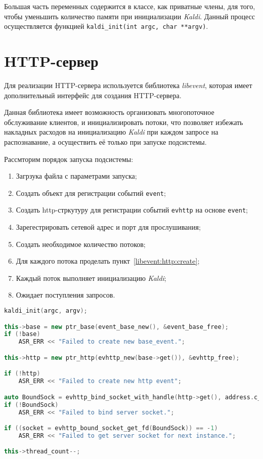 Большая часть переменных содержится в классе, как приватные члены, для того, чтобы
уменьшить количество памяти при инициализации \textit{Kaldi}.
Данный процесс осуществляется функцией \texttt{kaldi\_init(int argc, char **argv)}.
\section{HTTP-сервер}

Для реализации HTTP-сервера используется библиотека \textit{libevent}, которая
имеет дополнительный интерфейс для создания HTTP-сервера.

Данная библиотека имеет возможность организовать многопоточное обслуживание клиентов,
и инициализировать потоки, что позволяет избежать накладных расходов на инициализацию
\textit{Kaldi} при каждом запросе на распознавание, а осуществить её только
при запуске подсистемы.

Рассмторим порядок запуска подсистемы:
\begin{enumerate}
    \item Загрзука файла с параметрами запуска;\label{asr:init:conf}
    \item Создать объект для регистрации событий \texttt{event};\label{libevent:event:create}
    \item Создать http-стркутуру для регистрации событий \texttt{evhttp}
        на основе \texttt{event};\label{libevent:http:create}
    \item Зарегестрировать сетевой адрес и порт для прослушивания;\label{libevent:http:bind}
    \item Создать необходимое количество потоков;
    \item Для каждого потока проделать пункт~\ref{libevent:http:create};
    \item Каждый поток выполняет инициализацию \textit{Kaldi};
    \item Ожидает поступления запросов.
\end{enumerate}

\begin{lstlisting}[caption={Создание базовых объектов для инициализации подсистемы},label={asr:http:init},language=C++]
kaldi_init(argc, argv);

this->base = new ptr_base(event_base_new(), &event_base_free);
if (!base)
    ASR_ERR << "Failed to create new base_event.";

this->http = new ptr_http(evhttp_new(base->get()), &evhttp_free);

if (!http)
    ASR_ERR << "Failed to create new http event";

auto BoundSock = evhttp_bind_socket_with_handle(http->get(), address.c_str(), port);
if (!BoundSock)
    ASR_ERR << "Failed to bind server socket.";

if ((socket = evhttp_bound_socket_get_fd(BoundSock)) == -1)
    ASR_ERR << "Failed to get server socket for next instance.";

this->thread_count--;

\end{lstlisting}

